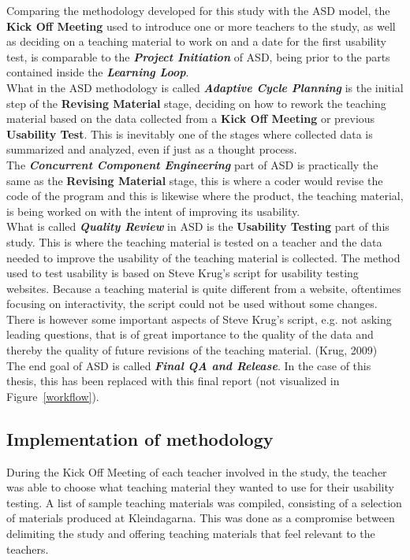 Comparing the methodology developed for this study with the ASD model, the \textbf{Kick Off Meeting} used to introduce one or more teachers to the study, as well as deciding on a teaching material to work on and a date for the first usability test, is comparable to the \textbf{\textit{Project Initiation}} of ASD, being prior to the parts contained inside the \textbf{\textit{Learning Loop}}.\\

What in the ASD methodology is called \textbf{\textit{Adaptive Cycle Planning}} is the initial step of the \textbf{Revising Material} stage, deciding on how to rework the teaching material based on the data collected from a \textbf{Kick Off Meeting} or previous \textbf{Usability Test}. This is inevitably one of the stages where collected data is summarized and analyzed, even if just as a thought process.\\

The \textbf{\textit{Concurrent Component Engineering}} part of ASD is practically the same as the \textbf{Revising Material} stage, this is where a coder would revise the code of the program and this is likewise where the product, the teaching material, is being worked on with the intent of improving its
usability.\\

What is called \textbf{\textit{Quality Review}} in ASD is the \textbf{Usability Testing} part of this study. This is where the teaching material is tested on a teacher and the data needed to improve the usability of the teaching material is collected. The method used to test usability is based on Steve Krug’s script for usability testing websites. Because a teaching material is quite different from a website, oftentimes focusing on interactivity, the script could not be used without some changes. There is however some important aspects of Steve Krug’s script, e.g. not asking leading questions, that is of great importance to the quality of the data and thereby the quality of future revisions of the teaching material. (Krug, 2009)\\

The end goal of ASD is called \textbf{\textit{Final QA and Release}}. In the case of this thesis, this has been replaced with this final report (not visualized in Figure~\ref{workflow}).\\

\subsection{Implementation of methodology}
During the Kick Off Meeting of each teacher involved in the study, the teacher was able to choose what teaching material they wanted to use for their usability testing. A list of sample teaching materials was compiled, consisting of a selection of materials produced at  Kleindagarna. This was done as a compromise between delimiting the study and offering teaching materials that feel relevant to the teachers.\\

